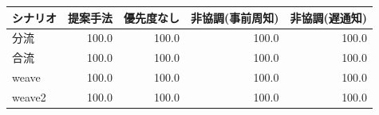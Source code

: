 \begin{tabular}{lrrrr}
\hline \hline
シナリオ & 提案手法 & 優先度なし & 非協調(事前周知) & 非協調(遅通知) \\
\hline
分流 & 100.0 & 100.0 & 100.0 & 100.0 \\
合流 & 100.0 & 100.0 & 100.0 & 100.0 \\
weave & 100.0 & 100.0 & 100.0 & 100.0 \\
weave2 & 100.0 & 100.0 & 100.0 & 100.0 \\
\hline
\end{tabular}
